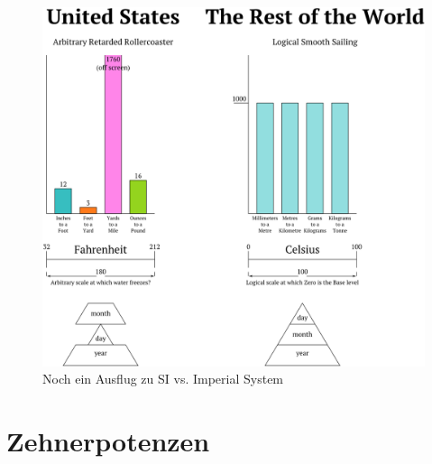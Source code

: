 \begin{frame}

  \begin{center}
    \begin{figure}
      \includegraphics[height=.9\textheight]{e01/imperial_vs_metric++.png}
      \caption{Noch ein Ausflug zu SI vs. Imperial System \cite{si_rollercoaster}}
      \label{fig_si_rollercoaster}
    \end{figure}
  \end{center}

\end{frame}

\section{Zehnerpotenzen}

